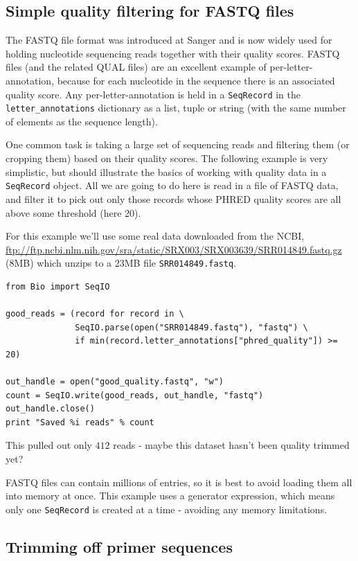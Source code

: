 \documentclass{report}
\begin{document}
\subsection{Simple quality filtering for FASTQ files}
\label{sec:FASTQ-filtering-example}

The FASTQ file format was introduced at Sanger and is now widely used for
holding nucleotide sequencing reads together with their quality scores.
FASTQ files (and the related QUAL files) are an excellent example of
per-letter-annotation, because for each nucleotide in the sequence there is
an associated quality score.  Any per-letter-annotation is held in a
\verb|SeqRecord| in the \verb|letter_annotations| dictionary as a list,
tuple or string (with the same number of elements as the sequence length).

One common task is taking a large set of sequencing reads and filtering them
(or cropping them) based on their quality scores.
The following example is very simplistic, but should illustrate the basics of
working with quality data in a \verb|SeqRecord| object.  All we are going to
do here is read in a file of FASTQ data, and filter it to pick out only those
records whose PHRED quality scores are all above some threshold (here 20).

For this example we'll use some real data downloaded from the NCBI,
\url{ftp://ftp.ncbi.nlm.nih.gov/sra/static/SRX003/SRX003639/SRR014849.fastq.gz}
(8MB) which unzips to a 23MB file \texttt{SRR014849.fastq}.

\begin{verbatim}
from Bio import SeqIO

good_reads = (record for record in \
              SeqIO.parse(open("SRR014849.fastq"), "fastq") \
              if min(record.letter_annotations["phred_quality"]) >= 20)

out_handle = open("good_quality.fastq", "w")
count = SeqIO.write(good_reads, out_handle, "fastq")
out_handle.close()
print "Saved %i reads" % count
\end{verbatim}

\noindent This pulled out only $412$ reads - maybe this dataset hasn't been
quality trimmed yet?

FASTQ files can contain millions of entries, so it is best to avoid loading
them all into memory at once.  This example uses a generator expression, which
means only one \verb|SeqRecord| is created at a time - avoiding any memory
limitations.

\subsection{Trimming off primer sequences}
\label{sec:FASTQ-slicing-off-primer}
\end{document}
